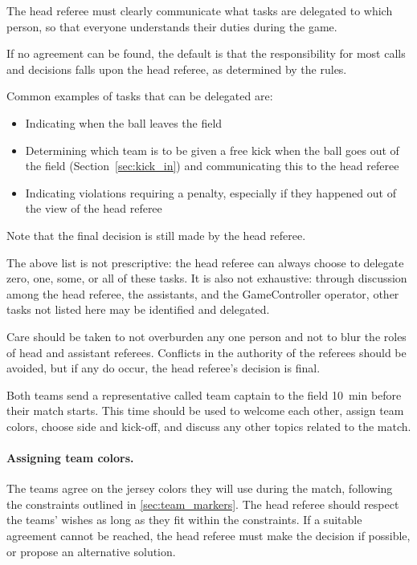 The head referee must clearly communicate what tasks are delegated to which person, so that everyone understands their duties during the game.

If no agreement can be found, the default is that the responsibility for most calls and decisions falls upon the head referee, as determined by the rules.

Common examples of tasks that can be delegated are:

\begin{itemize}
    \item Indicating when the ball leaves the field
    \item Determining which team is to be given a free kick when the ball goes out of the field (Section~\ref{sec:kick_in}) and communicating this to the head referee
    \item Indicating violations requiring a penalty, especially if they happened out of the view of the head referee
\end{itemize}

Note that the final decision is still made by the head referee.

The above list is not prescriptive: the head referee can always choose to delegate zero, one, some, or all of these tasks. It is also not exhaustive: through discussion among the head referee, the assistants, and the GameController operator, other tasks not listed here may be identified and delegated.

Care should be taken to not overburden any one person and not to blur the roles of head and assistant referees. Conflicts in the authority of the referees should be avoided, but if any do occur, the head referee's decision is final.

\label{sec:pre_game_meeting}

Both teams send a representative called team captain to the field \qty{10}{\minute} before their match starts. This time should be used to welcome each other, assign team colors, choose side and kick-off, and discuss any other topics related to the match.

\paragraph{Assigning team colors.} The teams agree on the jersey colors they will use during the match, following the constraints outlined in \cref{sec:team_markers}. The head referee should respect the teams' wishes as long as they fit within the constraints. If a suitable agreement cannot be reached, the head referee must make the decision if possible, or propose an alternative solution.

